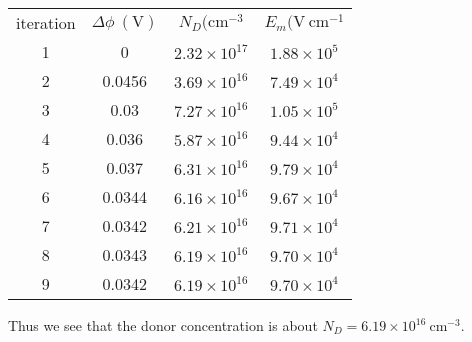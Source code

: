 \documentclass{article}
\begin{document}
\begin{tabular}{c | c c c} 
iteration & $\Delta \phi ~(\mathrm{V})$ & $N_D (\mathrm{cm}^{-3}$ & $E_m (\mathrm{V}~\mathrm{cm}^{-1}$ \\
1         & 0             & $2.32 \times 10^{17}$ & $1.88 \times 10^5$ \\
2         & 0.0456        & $3.69 \times 10^{16}$ & $7.49 \times 10^4$ \\
3         & 0.03          & $7.27 \times 10^{16}$ & $1.05 \times 10^5$ \\
4         & 0.036         & $5.87 \times 10^{16}$ & $9.44 \times 10^4$ \\
5         & 0.037         & $6.31 \times 10^{16}$ & $9.79 \times 10^4$ \\
6         & 0.0344        & $6.16 \times 10^{16}$ & $9.67 \times 10^4$ \\
7         & 0.0342        & $6.21 \times 10^{16}$ & $9.71 \times 10^4$ \\
8         & 0.0343        & $6.19 \times 10^{16}$ & $9.70 \times 10^4$ \\
9         & 0.0342        & $6.19 \times 10^{16}$ & $9.70 \times 10^4$
\end{tabular}

Thus we see that the donor concentration is about $N_D = 6.19 \times 10^{16} ~\mathrm{cm}^{-3}$.
\end{document}
